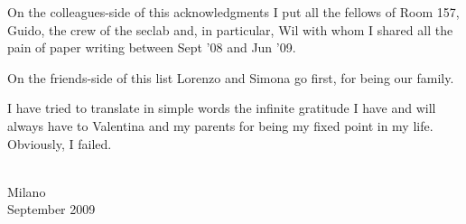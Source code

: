 \documentclass[10pt,showtrims,a4paper,twoside]{memoir} %
\begin{document}
On the colleagues-side of this acknowledgments I put all the fellows of Room 157, Guido, the crew of the seclab and, in particular, Wil with whom I shared all the pain of paper writing between Sept '08 and Jun '09.

On the friends-side of this list Lorenzo and Simona go first, for being our family.

I have tried to translate in simple words the infinite gratitude I have and will always have to Valentina and my parents for being my fixed point in my life. Obviously, I failed.

\begin{flushright}
\textsc{\theauthor}\\
Milano\\
September 2009
\end{flushright}

\cleartoverso %

\end{document}
